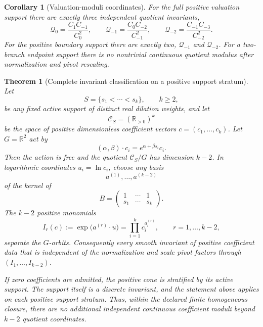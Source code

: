 \documentclass[aps,prd,reprint,onecolumn,nofootinbib,superscriptaddress,showkeys]{revtex4-2}
\numberwithin{equation}{section}
\theoremstyle{definition}
\theoremstyle{plain}
\newtheorem{theorem}{Theorem}[section]
\newtheorem{corollary}{Corollary}[section]
\begin{document}
\begin{corollary}[Valuation-moduli coordinates]\label{cor:valuation-moduli}
For the full positive valuation support there are exactly three independent quotient invariants,
\begin{equation}
\boxed{
\mathcal Q_0=\frac{C_1C_{-1}}{C_0^2},
\qquad
\mathcal Q_{-1}=\frac{C_0C_{-2}}{C_{-1}^2},
\qquad
\mathcal Q_{-2}=\frac{C_{-1}C_{-3}}{C_{-2}^2}.
}
\end{equation}
For the positive boundary support there are exactly two, $\mathcal Q_{-1}$ and $\mathcal Q_{-2}$.  For a two-branch endpoint support there is no nontrivial continuous quotient modulus after normalization and pivot rescaling.
\end{corollary}

\begin{theorem}[Complete invariant classification on a positive support stratum]\label{thm:invariant-completeness}
Let
\[
S=\{s_1<\cdots<s_k\},\qquad k\ge2,
\]
be any fixed active support of distinct real dilation weights, and let
\[
\mathcal C_S=(\mathbb R_{>0})^k
\]
be the space of positive dimensionless coefficient vectors $c=(c_1,\ldots,c_k)$.  Let $G=\mathbb R^2$ act by
\begin{equation}
(\alpha,\beta)\cdot c_i=e^{\alpha+\beta s_i}c_i.
\end{equation}
Then the action is free and the quotient $\mathcal C_S/G$ has dimension $k-2$.  In logarithmic coordinates $u_i=\ln c_i$, choose any basis
\[
a^{(1)},\ldots,a^{(k-2)}
\]
of the kernel of
\begin{equation}
B=
\begin{pmatrix}
1&\cdots&1\\
s_1&\cdots&s_k
\end{pmatrix}.
\end{equation}
The $k-2$ positive monomials
\begin{equation}
\boxed{
I_r(c):=\exp\!\bigl(a^{(r)}\!\cdot u\bigr)
       =\prod_{i=1}^{k}c_i^{a_i^{(r)}},
\qquad r=1,\ldots,k-2,
}
\end{equation}
separate the $G$-orbits.  Consequently every smooth invariant of positive coefficient data that is independent of the normalization and scale pivot factors through $(I_1,\ldots,I_{k-2})$.

If zero coefficients are admitted, the positive cone is stratified by its active support.  The support itself is a discrete invariant, and the statement above applies on each positive support stratum.  Thus, within the declared finite homogeneous closure, there are no additional independent continuous coefficient moduli beyond $k-2$ quotient coordinates.
\end{theorem}
\end{document}
